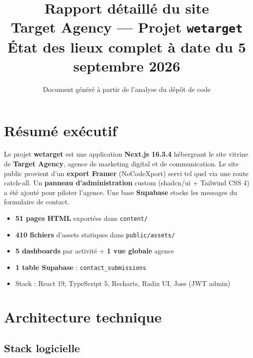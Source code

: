 \documentclass[11pt,a4paper]{report}
\title{
  \vspace{1cm}
  {\Huge\bfseries Rapport détaillé du site}\\[0.4cm]
  {\Large Target Agency — Projet \texttt{wetarget}}\\[0.8cm]
  {\large État des lieux complet à date du 5 septembre 2026}
}
\author{Document généré à partir de l'analyse du dépôt de code}
\date{}
\begin{document}
\maketitle
\thispagestyle{empty}
\newpage

\tableofcontents
\newpage

\chapter{Résumé exécutif}

Le projet \textbf{wetarget} est une application \textbf{Next.js 16.3.4} hébergeant le site vitrine de \textbf{Target Agency}, agence de marketing digital et de communication. Le site public provient d'un \textbf{export Framer} (NoCodeXport) servi tel quel via une route catch-all. Un \textbf{panneau d'administration} custom (shadcn/ui + Tailwind CSS 4) a été ajouté pour piloter l'agence. Une base \textbf{Supabase} stocke les messages du formulaire de contact.

\begin{itemize}[leftmargin=*]
  \item \textbf{51 pages HTML} exportées dans \texttt{content/}
  \item \textbf{410 fichiers} d'assets statiques dans \texttt{public/assets/}
  \item \textbf{5 dashboards} par activité + \textbf{1 vue globale} agence
  \item \textbf{1 table Supabase} : \texttt{contact\_submissions}
  \item Stack : React 19, TypeScript 5, Recharts, Radix UI, Jose (JWT admin)
\end{itemize}

\chapter{Architecture technique}

\section{Stack logicielle}
\end{document}
